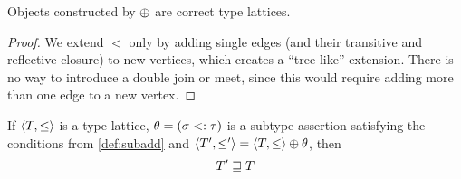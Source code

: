 \documentclass[main.tex]{subfiles}
\begin{document}
\begin{property}
    Objects constructed by $\oplus$ are correct type lattices.
\end{property}
\begin{proof}
    We extend $\less$ only by adding single edges (and their transitive and
    reflective closure) to new vertices, which creates a ``tree-like'' extension.
    There is no way to introduce a double join or meet, since this would
    require adding more than one edge to a new vertex.
\end{proof}

\begin{lemma}
    \label{lemma:subadd:rel}
    If $\langle  T,  \leq  \rangle$ is a type lattice, $\theta = (\sigma <: \tau)$
    is a subtype assertion satisfying the conditions from \cref{def:subadd}
    and $\langle  T',  \leq'  \rangle = \langle  T,  \leq  \rangle \oplus \theta$, then
    \[ T' \sqsupseteq T \]
\end{lemma}
\end{document}
